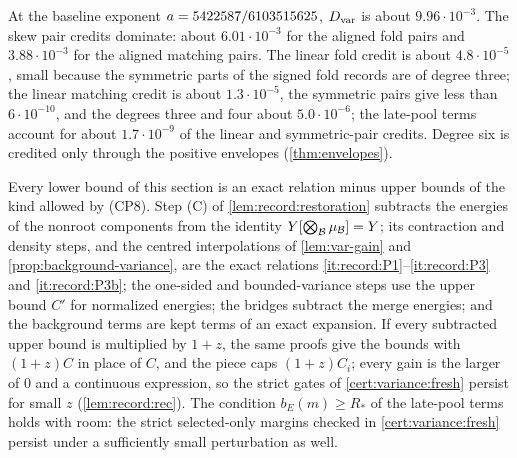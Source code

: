 \begin{remark}[Sizes]\label{rem:variance:sizes}
At the baseline exponent $a=5422587/6103515625$, $D_{\rm var}$ is about $9.96\cdot10^{-3}$. The skew
pair credits dominate: about $6.01\cdot10^{-3}$ for the aligned fold pairs and
$3.88\cdot10^{-3}$ for the aligned matching pairs. The linear fold credit is
about $4.8\cdot10^{-5}$, small because the symmetric parts of the signed fold
records are of degree three; the linear matching credit is about
$1.3\cdot10^{-5}$, the symmetric pairs give less than $6\cdot10^{-10}$, and the
degrees three and four about $5.0\cdot10^{-6}$; the late-pool terms account for
about $1.7\cdot10^{-9}$ of the linear and symmetric-pair credits. Degree six is credited only
through the positive envelopes (\cref{thm:envelopes}).
\end{remark}

\begin{remark}[Robustness]\label{rem:variance:robust}
Every lower bound of this section is an exact relation minus upper bounds of
the kind allowed by (CP8). Step (C) of \cref{lem:record:restoration} subtracts
the energies of the nonroot components from the identity
$Y[\bigotimes_\mathcal B\mu_\mathcal B]=Y$; its contraction and density steps, and the
centred interpolations of \cref{lem:var-gain} and \cref{prop:background-variance},
are the exact relations \ref{it:record:P1}--\ref{it:record:P3} and
\ref{it:record:P3b}; the one-sided and bounded-variance steps use the upper bound
$C'$ for normalized energies; the bridges subtract the merge energies; and the
background terms are kept terms of an exact expansion. If every subtracted upper
bound is multiplied by $1+z$, the same proofs give the bounds with $(1+z)C$ in
place of $C$, and the piece caps $(1+z)C_i$; every gain is the larger of $0$ and a
continuous expression, so the strict gates of \cref{cert:variance:fresh} persist
for small $z$ (\cref{lem:record:rec}). The condition $b_E(m)\ge R_*$ of the
late-pool terms holds with room: the strict selected-only margins checked in \cref{cert:variance:fresh}
persist under a sufficiently small perturbation as well.
\end{remark}

